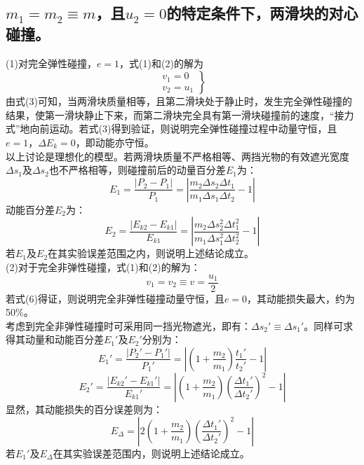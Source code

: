 \documentclass{article}
\begin{document}
\subsection{\(m_1 = m_2 \equiv m\)，且\(u_2 = 0\)的特定条件下，两滑块的对心碰撞。}
(1)对完全弹性碰撞，\(e = 1\)，式(1)和(2)的解为\\
\begin{equation}
    \left.\begin{array}{l}
    v_1 = 0 \\
    v_2 = u_1
    \end{array}\right\}
\end{equation}
由式(3)可知，当两滑块质量相等，且第二滑块处于静止时，发生完全弹性碰撞的结果，使第一滑块静止下来，而第二滑块完全具有第一滑块碰撞前的速度，“接力式”地向前运动。若式(3)得到验证，则说明完全弹性碰撞过程中动量守恒，且$e = 1$，$\Delta E_{k}=0$，即动能亦守恒。\\
\hspace*{2em}以上讨论是理想化的模型。若两滑块质量不严格相等、两挡光物的有效遮光宽度$\Delta s_1$及$\Delta s_2$也不严格相等，则碰撞前后的动量百分差$E_1$为：
\begin{equation}
    E_1=\frac{|P_2 - P_1|}{P_1}=\left|\frac{m_2\Delta s_2\Delta t_1}{m_1\Delta s_1\Delta t_2}-1\right|
\end{equation}
动能百分差$E_2$为：
\begin{equation}
    E_2=\frac{|E_{k2}-E_{k1}|}{E_{k1}}=\left|\frac{m_2\Delta s_2^{2}\Delta t_1^{2}}{m_1\Delta s_1^{2}\Delta t_2^{2}} - 1\right|
\end{equation}
若$E_1$及$E_2$在其实验误差范围之内，则说明上述结论成立。\\
(2)对于完全非弹性碰撞，式(1)和(2)的解为：\\
\begin{equation}
    v_1 = v_2 \equiv v = \frac{u_1}{2}
\end{equation}
若式(6)得证，则说明完全非弹性碰撞动量守恒，且$e = 0$，其动能损失最大，约为50\%。\\
\hspace*{2em}考虑到完全非弹性碰撞时可采用同一挡光物遮光，即有：$\Delta s_2' \equiv \Delta s_1'$。同样可求得其动量和动能百分差$E_1'$及$E_2'$分别为：
\begin{equation}
    E_1'=\frac{|P_2' - P_1'|}{P_1'}=\left|\left(1 + \frac{m_2}{m_1}\right)\frac{t_1'}{t_2'} - 1\right|
\end{equation}
\begin{equation}
    E_2'=\frac{|E_{k2}' - E_{k1}'|}{E_{k1}'}=\left|\left(1 + \frac{m_2}{m_1}\right)\left(\frac{\Delta t_1'}{\Delta t_2'}\right)^2 - 1\right|
\end{equation}
显然，其动能损失的百分误差则为：
\begin{equation}
    E_{\Delta}=\left|2\left(1 + \frac{m_2}{m_1}\right)\left(\frac{\Delta t_1'}{\Delta t_2'}\right)^2 - 1\right|
\end{equation}
若$E_1'$及$E_{\Delta}$在其实验误差范围内，则说明上述结论成立。
\end{document}
